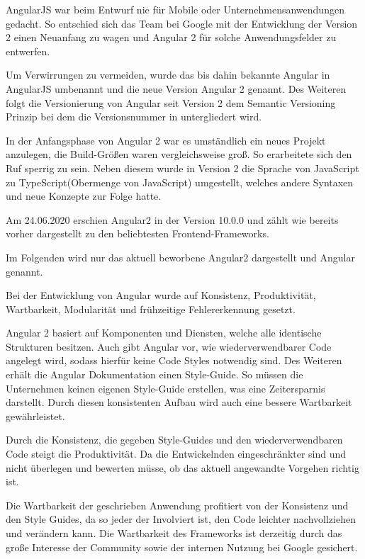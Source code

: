 AngularJS war beim Entwurf nie für Mobile oder Unternehmensanwendungen gedacht.
So entschied sich das Team bei Google mit der Entwicklung der Version 2 einen Neuanfang zu wagen und Angular 2 für solche Anwendungsfelder zu entwerfen.

Um Verwirrungen zu vermeiden, wurde das bis dahin bekannte Angular in AngularJS umbenannt und die neue Version Angular 2 genannt. Des Weiteren folgt die Versionierung von Angular seit Version 2 dem Semantic Versioning Prinzip bei dem die Versionsnummer in  untergliedert wird. 

In der Anfangsphase von Angular 2 war es umständlich ein neues Projekt anzulegen, die Build-Größen waren vergleichsweise groß. So erarbeitete sich den Ruf sperrig zu sein.
Neben diesem wurde in Version 2 die Sprache von JavaScript zu TypeScript(Obermenge von JavaScript) umgestellt, welches andere Syntaxen und neue Konzepte zur Folge hatte. \cite{gaviganHistoryAngular2018}

Am 24.06.2020 erschien Angular2 in der Version 10.0.0 \cite{googleAngularAngularVersioning2020} und zählt wie bereits vorher dargestellt zu den beliebtesten Frontend-Frameworks.

Im Folgenden wird nur das aktuell beworbene Angular2 dargestellt und Angular genannt.

Bei der Entwicklung von Angular wurde auf Konsistenz, Produktivität, Wartbarkeit, Modularität und frühzeitige Fehlererkennung gesetzt.

Angular 2 basiert auf Komponenten und Diensten, welche alle identische Strukturen besitzen. Auch gibt Angular vor, wie wiederverwendbarer Code angelegt wird, sodass hierfür keine Code Styles notwendig sind. Des Weiteren erhält die Angular Dokumentation einen Style-Guide. So müssen die Unternehmen keinen eigenen Style-Guide erstellen, was eine Zeitersparnis darstellt.
Durch diesen konsistenten Aufbau wird auch eine bessere Wartbarkeit gewährleistet.

Durch die Konsistenz, die gegeben Style-Guides und den wiederverwendbaren Code steigt die Produktivität. Da die Entwickelnden eingeschränkter sind und nicht überlegen und bewerten müsse, ob das aktuell angewandte Vorgehen richtig ist. 

Die Wartbarkeit der geschrieben Anwendung profitiert von der Konsistenz und den Style Guides, da so jeder der Involviert ist, den Code leichter nachvollziehen und verändern kann. Die Wartbarkeit des Frameworks ist derzeitig durch das große Interesse der Community sowie der internen Nutzung bei Google gesichert.

